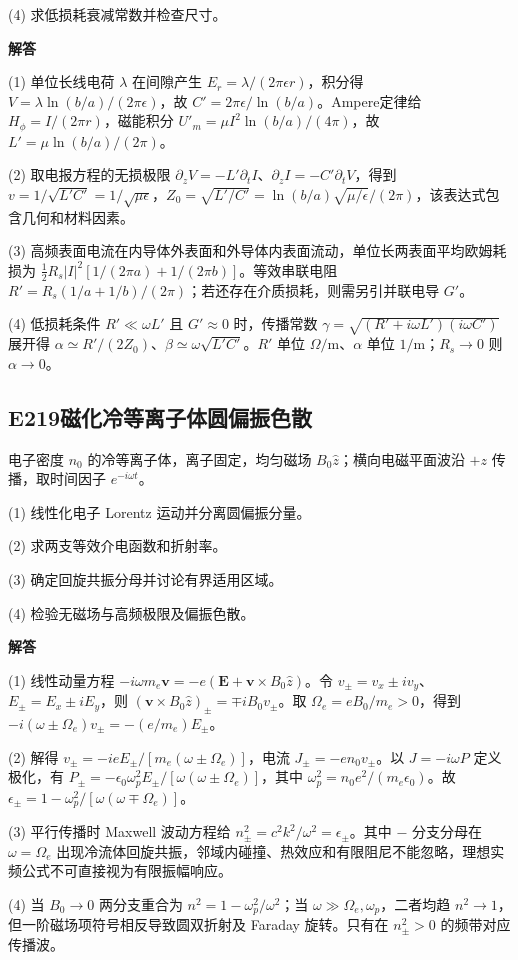 (4) 求低损耗衰减常数并检查尺寸。

\par\textbf{解答}

(1) 单位长线电荷 $\lambda$ 在间隙产生 $E_r=\lambda/(2\pi\epsilon r)$，积分得 $V=\lambda\ln(b/a)/(2\pi\epsilon)$，故 $C'=2\pi\epsilon/\ln(b/a)$。Ampere定律给 $H_\phi=I/(2\pi r)$，磁能积分 $U'_m=\mu I^2\ln(b/a)/(4\pi)$，故 $L'=\mu\ln(b/a)/(2\pi)$。

(2) 取电报方程的无损极限 $\partial_zV=-L'\partial_tI$、$\partial_zI=-C'\partial_tV$，得到 $v=1/\sqrt{L'C'}=1/\sqrt{\mu\epsilon}$，$Z_0=\sqrt{L'/C'}=\ln(b/a)\sqrt{\mu/\epsilon}/(2\pi)$，该表达式包含几何和材料因素。

(3) 高频表面电流在内导体外表面和外导体内表面流动，单位长两表面平均欧姆耗损为 $\frac12R_s|I|^2[1/(2\pi a)+1/(2\pi b)]$。等效串联电阻 $R'=R_s(1/a+1/b)/(2\pi)$；若还存在介质损耗，则需另引并联电导 $G'$。

(4) 低损耗条件 $R'\ll\omega L'$ 且 $G'\approx0$ 时，传播常数 $\gamma=\sqrt{(R'+i\omega L')(i\omega C')}$ 展开得 $\alpha\simeq R'/(2Z_0)$、$\beta\simeq\omega\sqrt{L'C'}$。$R'$ 单位 $\Omega/\mathrm m$、$\alpha$ 单位 $1/\mathrm m$；$R_s\to0$ 则 $\alpha\to0$。

\par\medskip

\subsection*{E219\quad 磁化冷等离子体圆偏振色散}

电子密度 $n_0$ 的冷等离子体，离子固定，均匀磁场 $B_0\hat z$；横向电磁平面波沿 $+z$ 传播，取时间因子 $e^{-i\omega t}$。

(1) 线性化电子 Lorentz 运动并分离圆偏振分量。

(2) 求两支等效介电函数和折射率。

(3) 确定回旋共振分母并讨论有界适用区域。

(4) 检验无磁场与高频极限及偏振色散。

\par\textbf{解答}

(1) 线性动量方程 $-i\omega m_e\mathbf v=-e(\mathbf E+\mathbf v\times B_0\hat z)$。令 $v_\pm=v_x\pm i v_y$、$E_\pm=E_x\pm iE_y$，则 $(\mathbf v\times B_0\hat z)_\pm=\mp iB_0v_\pm$。取 $\Omega_e=eB_0/m_e>0$，得到 $-i(\omega\pm\Omega_e)v_\pm=-(e/m_e)E_\pm$。

(2) 解得 $v_\pm=-i eE_\pm/[m_e(\omega\pm\Omega_e)]$，电流 $J_\pm=-en_0v_\pm$。以 $J=-i\omega P$ 定义极化，有 $P_\pm=-\epsilon_0\omega_p^2E_\pm/[\omega(\omega\pm\Omega_e)]$，其中 $\omega_p^2=n_0e^2/(m_e\epsilon_0)$。故 $\epsilon_\pm=1-\omega_p^2/[\omega(\omega\mp\Omega_e)]$。

(3) 平行传播时 Maxwell 波动方程给 $n_\pm^2=c^2k^2/\omega^2=\epsilon_\pm$。其中 $-$ 分支分母在 $\omega=\Omega_e$ 出现冷流体回旋共振，邻域内碰撞、热效应和有限阻尼不能忽略，理想实频公式不可直接视为有限振幅响应。

(4) 当 $B_0\to0$ 两分支重合为 $n^2=1-\omega_p^2/\omega^2$；当 $\omega\gg\Omega_e,\omega_p$，二者均趋 $n^2\to1$，但一阶磁场项符号相反导致圆双折射及 Faraday 旋转。只有在 $n_\pm^2>0$ 的频带对应传播波。

\par\medskip
